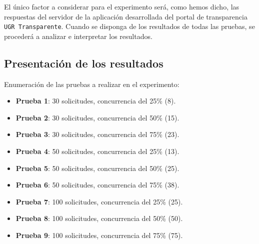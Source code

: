 \bigskip
El único factor a considerar para el experimento será, como hemos dicho, las respuestas del servidor de la aplicación desarrollada del portal de transparencia {\tt UGR Transparente}. Cuando se disponga de los resultados de todas las pruebas, se procederá a analizar e interpretar los resultados.

\subsection{Presentación de los resultados}

Enumeración de las pruebas a realizar en el experimento:

\begin{itemize}
	\item \textbf{Prueba 1}: 30 solicitudes, concurrencia del 25\% (8).
	\item \textbf{Prueba 2}: 30 solicitudes, concurrencia del 50\% (15).
	\item \textbf{Prueba 3}: 30 solicitudes, concurrencia del 75\% (23).
	\item \textbf{Prueba 4}: 50 solicitudes, concurrencia del 25\% (13).
	\item \textbf{Prueba 5}: 50 solicitudes, concurrencia del 50\% (25).
	\item \textbf{Prueba 6}: 50 solicitudes, concurrencia del 75\% (38).
	\item \textbf{Prueba 7}: 100 solicitudes, concurrencia del 25\% (25).
	\item \textbf{Prueba 8}: 100 solicitudes, concurrencia del 50\% (50).
	\item \textbf{Prueba 9}: 100 solicitudes, concurrencia del 75\% (75).
\end{itemize}

